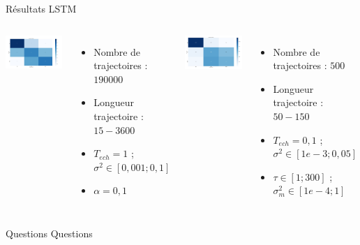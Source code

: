 \documentclass{beamer}
\begin{document}
	\begin{frame}{Résultats LSTM}
        \begin{columns}
            \centering
            \includegraphics[width=0.9\linewidth]{Images/lstm_test.jpeg}
            \begin{itemize}
                \item Nombre de trajectoires : $190 000$
                \item Longueur trajectoire : $15 - 3600$
                \item $T_{ech}=1$ ; $\sigma^2 \in [0,001; 0,1]$
                \item $\alpha = 0,1$
            \end{itemize}
    
            \centering
            \includegraphics[width=0.9\linewidth]{Images/lstm_long.jpeg}
            \begin{itemize}
                \item Nombre de trajectoires : $500$
                \item Longueur trajectoire : $50-150$
                \item $T_{ech}=0,1$ ; $\sigma^2 \in [1e-3; 0,05]$
                \item $\tau \in [1; 300]$ ; $\sigma_m^2 \in [1e-4; 1]$
            \end{itemize}
        \end{columns}
    \end{frame}

    \begin{frame}{Questions}
        \Huge Questions
    \end{frame}
	
\end{document}
